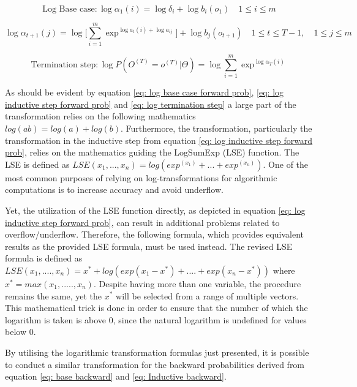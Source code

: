 \begin{equation}
    \text{Log Base case}: \log\alpha_1(i) = \log\delta_i + \log b_i(o_1) \quad  1 \leq i \leq m
    \label{eq: log base case forward prob}
\end{equation}

\begin{equation}
    \log\alpha_{t+1}(j) = \log\Big[\sum_{i=1}^m \exp^{\log a_t(i)+\log a_{ij}}\Big] + \log b_j(o_{t+1}) \quad 1\leq t \leq T - 1, \quad
    1 \leq j \leq m
    \label{eq: log inductive step forward prob}
\end{equation}

\begin{equation}
     \text{Termination step}: \log P(O^{(T)} = o^{(T)}|\Theta) = \log\sum_{i=1}^m \exp^{\log\alpha_T(i)}
    \label{eq: log termination step}
\end{equation}

As should be evident by equation \ref{eq: log base case forward prob}, \ref{eq: log inductive step forward prob} and \ref{eq: log termination step} a large part of the transformation relies on the following mathematics $log(ab) = log(a) + log(b)$. Furthermore, the transformation, particularly the transformation in the inductive step from equation \ref{eq: log inductive step forward prob}, relies on the mathematics guiding the LogSumExp (LSE) function. The LSE is defined as $LSE(x_1,...,x_n) = log(exp^{(x_1)}+...+exp^{(x_n)})$. One of the most common purposes of relying on log-transformations for algorithmic computations is to increase accuracy and avoid underflow. 

Yet, the utilization of the LSE function directly, as depicted in equation \ref{eq: log inductive step forward prob}, can result in additional problems related to overflow/underflow. Therefore, the following formula, which provides equivalent results as the provided LSE formula, must be used instead. The revised LSE formula is defined as $LSE(x_1,....,x_n) = x^* + log(exp(x_1-x^*)+....+exp(x_n-x^*))$ where $x^* = max(x_1,.....,x_n)$. Despite having more than one variable, the procedure remains the same, yet the $x^*$ will be selected from a range of multiple vectors. This mathematical trick is done in order to ensure that the number of which the logarithm is taken is above 0, since the natural logarithm is undefined for values below 0. 

By utilising the logarithmic transformation formulas just presented, it is possible to conduct a similar transformation for the backward probabilities derived from equation \ref{eq: base backward} and \ref{eq: Inductive backward}. 

